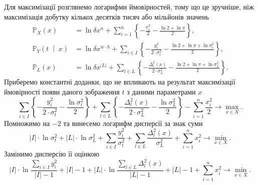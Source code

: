 Для максимізації розглянемо логарифми ймовірностей,
тому що це зручніше,
ніж максимізація добутку кількох десятків тисяч або мільйонів значень
\begin{equation*}
  \begin{split}
    \mathbb{P}_X\left( x \right)
    &= \ln{\delta x^n} +
        \sum_{i = 1}^n
        \left\{
          - \frac{x_i^2}{2}
          - \frac{\ln{2} + \ln{\pi}}{2}
        \right\}, \\
    \mathbb{P}_Y\left( t \;\middle|\; x \right)
    &= \ln{\delta x^{w \cdot h}} +
        \sum_{i \in I}
        \left\{
          - \frac{y_i^2}{2 \cdot \sigma^2_t}
          - \frac{\ln{2} + \ln{\pi} + \ln{\sigma^2_t}}{2}
        \right\}, \\
    \mathbb{P}_L\left( x \right)
    &= \ln{\delta x^{\left| L \right|}} +
        \sum_{l \in L}
        \left\{
          - \frac{\Delta_l^2\left( x \right)}{2 \cdot \sigma_L^2}
          - \frac{\ln{2} + \ln{\pi} + \ln{\sigma_L^2}}{2}
        \right\}.
  \end{split}
\end{equation*}
Приберемо константні доданки,
що не впливають на результат максимізації ймовірності
появи даного зображення $t$ з даними параметрами $x$
\begin{equation*}
  \sum_{i \in I}
    \left\{
      - \frac{y_i^2}{2 \cdot \sigma^2_t}
      - \frac{\ln{\sigma^2_t}}{2}
    \right\}
  +
  \sum_{l \in L}
    \left\{
      - \frac{\Delta_l^2\left( x \right)}{2 \cdot \sigma_L^2}
      - \frac{\ln{\sigma_L^2}}{2}
    \right\}
  - \sum_{i = 1}^n \frac{x_i^2}{2}
  \to \max\limits_{x \in X}.
\end{equation*}
Помножимо на $-2$ та винесемо логарифм дисперсії за знак суми
\begin{equation}\label{eq:minimize}
  \left| I \right| \cdot \ln{\sigma^2_t}
  + \left| L \right| \cdot \ln{\sigma_L^2}
  + \sum_{i \in I} \frac{y_i^2}{\sigma^2_t}
  + \sum_{l \in L} \frac{\Delta_l^2\left( x \right)}{\sigma_L^2}
  + \sum_{i = 1}^n x_i^2
  \to \min\limits_{x \in X}.
\end{equation}
Замінимо дисперсію її оцінкою
\cite{BorovkovMS}
\begin{equation*}
  \left| I \right|
  \cdot \ln{
    \frac{\sum\limits_{i \in I} y_i^2}
         {\left| I \right| - 1}}
  + \left| I \right| - 1
  + \left| L \right|
  \cdot \ln{
    \frac{\sum\limits_{l \in L} \Delta_l^2\left( x \right)}
         {\left| L \right| - 1}}
  + \left| L \right| - 1
  + \sum_{i = 1}^n x_i^2
  \to \min\limits_{x \in X}.
\end{equation*}
